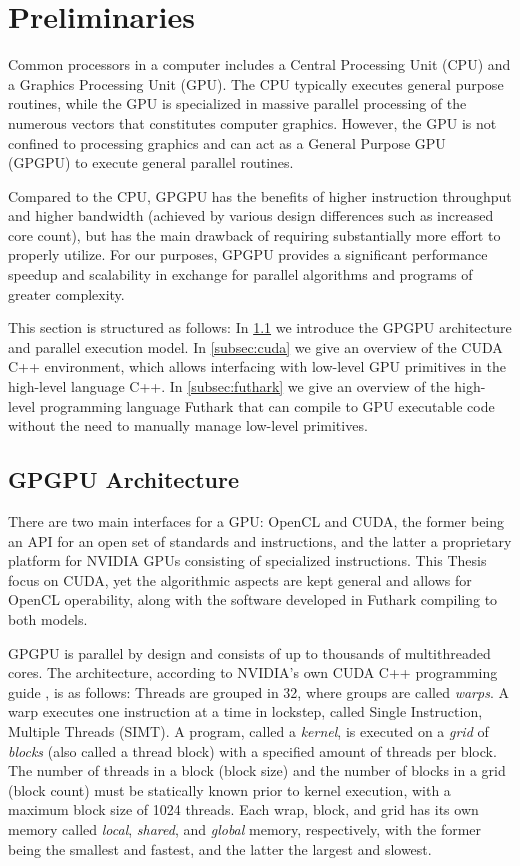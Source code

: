 \section{Preliminaries}
\label{sec:pre}
Common processors in a computer includes a Central Processing Unit (CPU) and a
Graphics Processing Unit (GPU). The CPU typically executes general purpose
routines, while the GPU is specialized in massive parallel processing of the
numerous vectors that constitutes computer graphics. However, the GPU is not
confined to processing graphics and can act as a General Purpose GPU (GPGPU) to
execute general parallel routines.

Compared to the CPU, GPGPU has the benefits of higher instruction throughput and
higher bandwidth (achieved by various design differences such as increased core
count), but has the main drawback of requiring substantially more effort to
properly utilize. For our purposes, GPGPU provides a significant performance
speedup and scalability in exchange for parallel algorithms and programs of
greater complexity.

This section is structured as follows: In \ref{subsec:gpgpu} we introduce the
GPGPU architecture and parallel execution model. In \ref{subsec:cuda} we give an
overview of the CUDA C++ environment, which allows interfacing with low-level
GPU primitives in the high-level language C++. In \ref{subsec:futhark} we give
an overview of the high-level programming language Futhark that can compile to
GPU executable code without the need to manually manage low-level primitives.

\subsection{GPGPU Architecture}
\label{subsec:gpgpu}

There are two main interfaces for a GPU: OpenCL and CUDA, the former being an
API for an open set of standards and instructions, and the latter a proprietary
platform for NVIDIA GPUs consisting of specialized instructions. This Thesis
focus on CUDA, yet the algorithmic aspects are kept general and allows for
OpenCL operability, along with the software developed in Futhark compiling to
both models.

GPGPU is parallel by design and consists of up to thousands of multithreaded
cores. The architecture, according to NVIDIA's own CUDA C++ programming guide
\cite{cudaguide}, is as follows: Threads are grouped in 32, where groups are
called \textit{warps}. A warp executes one instruction at a time in lockstep,
called Single Instruction, Multiple Threads (SIMT). A program, called a
\textit{kernel}, is executed on a \textit{grid} of \textit{blocks} (also called
a thread block) with a specified amount of threads per block. The number of
threads in a block (block size) and the number of blocks in a grid (block count)
must be statically known prior to kernel execution, with a maximum block size of
1024 threads. Each wrap, block, and grid has its own memory called
\textit{local}, \textit{shared}, and \textit{global} memory, respectively, with
the former being the smallest and fastest, and the latter the largest and
slowest.

